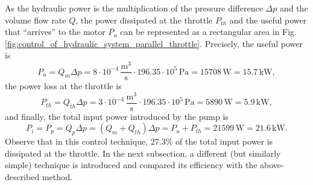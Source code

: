 As the hydraulic power is the multiplication of the pressure difference $\Delta p$ and the volume flow rate $Q$, the power dissipated at the throttle $P_{th}$ and the useful power that ``arrives'' to the motor $P_u$ can be represented as a rectangular area in Fig.\,\ref{fig:control_of_hydraulic_system_parallel_throttle}. Precisely, the useful power is
%
\begin{equation}
P_u = Q_m \Delta p = 8 \cdot 10^{-4}\,\mathrm{\frac{m^3}{s}} \cdot 196.35 \cdot 10^5\,\mathrm{Pa} = 15708\,\mathrm{W} = 15.7\,\mathrm{kW},
\end{equation}
%
the power loss at the throttle is
%
\begin{equation}
P_{th} = Q_{th} \Delta p = 3 \cdot 10^{-4}\,\mathrm{\frac{m^3}{s}} \cdot 196.35 \cdot 10^5\,\mathrm{Pa} = 5890\,\mathrm{W} = 5.9\,\mathrm{kW},
\end{equation}
%
and finally, the total input power introduced by the pump is
%
\begin{equation}
P_i = P_p = Q_p \Delta p = (Q_m+Q_{th}) \Delta p = P_u + P_{th} = 21599\,\mathrm{W} = 21.6\,\mathrm{kW}.
\end{equation}
%
Observe that in this control technique, $27.3\%$ of the total input power is dissipated at the throttle. In the next subsection, a different (but similarly simple) technique is introduced and compared its efficiency with the above-described method.

